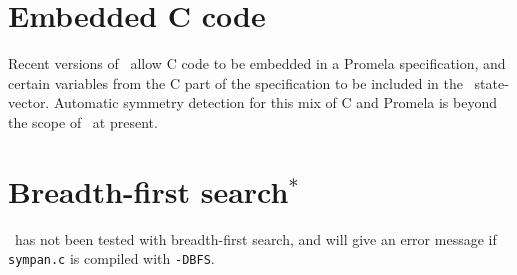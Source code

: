 \section{Embedded C code}

Recent versions of \spin\ allow C code to be embedded in a Promela
specification, and certain variables from the C part of the
specification to be included in the \spin\ state-vector.  Automatic
symmetry detection for this mix of C and Promela is beyond the scope
of \topspin\ at present.


\section{Breadth-first search$^\ast$}

\topspin\ has not been tested with breadth-first search, and will give an
error message if \texttt{sympan.c} is compiled with \texttt{-DBFS}.
